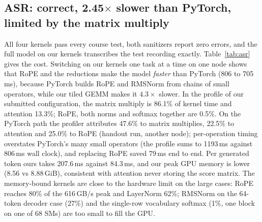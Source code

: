 \documentclass{article}
\begin{document}
\subsection{ASR: correct, 2.45$\times$ slower than PyTorch, limited by the matrix multiply}

All four kernels pass every course test, both sanitizers report zero errors, and the full model on our kernels transcribes the test recording exactly. Table~\ref{tab:asr} gives the cost. Switching on our kernels one task at a time on one node shows that RoPE and the reductions make the model \emph{faster} than PyTorch (806 to 705\,ms), because PyTorch builds RoPE and RMSNorm from chains of small operators, while our tiled GEMM makes it $4.3\times$ slower. In the profile of our submitted configuration, the matrix multiply is 86.1\% of kernel time and attention 13.3\%; RoPE, both norms and softmax together are 0.5\%. On the PyTorch path the profiler attributes 47.6\% to matrix multiplies, 22.5\% to attention and 25.0\% to RoPE (handout run, another node); per-operation timing overstates PyTorch's many small operators (the profile sums to 1193\,ms against 806\,ms wall clock), and replacing RoPE saved 79\,ms end to end. Per generated token ours takes 207.6\,ms against 84.3\,ms, and our peak GPU memory is lower (8.56 vs 8.88\,GiB), consistent with attention never storing the score matrix. The memory-bound kernels are close to the hardware limit on the large cases: RoPE reaches 80\% of the 616\,GB/s peak and LayerNorm 62\%; RMSNorm on the 64-token decoder case (27\%) and the single-row vocabulary softmax (1\%, one block on one of 68 SMs) are too small to fill the GPU.
\end{document}
